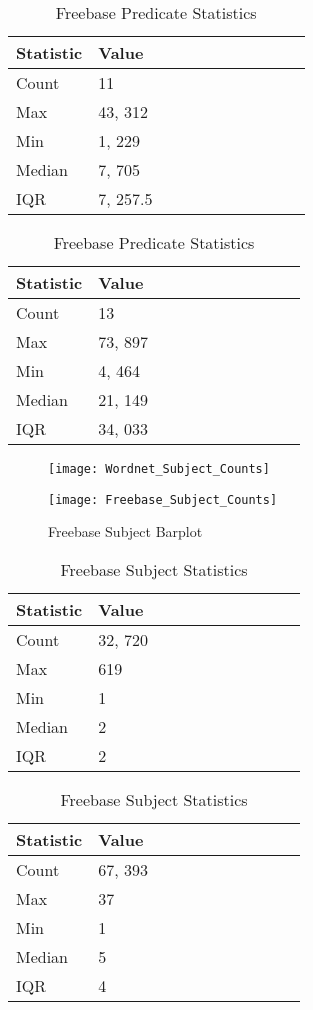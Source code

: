 \begin{table}[H]
	\parbox{.5\linewidth}{
		\caption{Wordnet Predicate Statistics}
		\centering
		\begin{tabular}{lllllllllll}
  			\textbf{Statistic} & \textbf{Value}  \\
  			\hline
			Count & 11 \\
			Max & 43, 312  \\
			Min & 1, 229  \\
  			Median & 7, 705  \\
  			IQR & 7, 257.5  \\
		\end{tabular}
		}
	\hfill
	\parbox{.5\linewidth}{
		\caption{Freebase Predicate Statistics}
		\centering
		\begin{tabular}{lllllllllll}
  			\textbf{Statistic} & \textbf{Value}  \\
  			\hline
			Count & 13 \\
			Max & 73, 897  \\
			Min & 4, 464  \\
  			Median & 21, 149  \\
  			IQR & 34, 033  \\
		\end{tabular}
		}
\end{table}

\begin{figure}[H]
	\parbox{.5\linewidth}{
   		\caption{Wordnet Subject Barplot}
   		\centering
    		\texttt{[image: Wordnet\_Subject\_Counts]}
		}
	\hfill
	\parbox{.5\linewidth}{
		\caption{Freebase Subject Barplot}
   		\centering
		\texttt{[image: Freebase\_Subject\_Counts]}
		}
\end{figure}


\begin{table}[H]
	\parbox{.5\linewidth}{
		\caption{Wordnet Subject Statistics}
		\centering
		\begin{tabular}{lllllllllll}
  			\textbf{Statistic} & \textbf{Value}  \\
  			\hline
			Count & 32, 720 \\
			Max & 619 \\
			Min & 1 \\
  			Median & 2 \\
  			IQR & 2 \\
		\end{tabular}
		}
	\hfill
	\parbox{.5\linewidth}{
		\caption{Freebase Subject Statistics}
		\centering
		\begin{tabular}{lllllllllll}
  			\textbf{Statistic} & \textbf{Value}  \\
  			\hline
			Count & 67, 393 \\
			Max & 37 \\
			Min & 1 \\
  			Median & 5 \\
  			IQR & 4 \\
		\end{tabular}
		}
\end{table}



